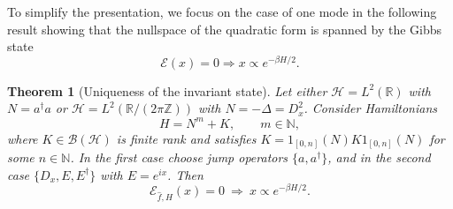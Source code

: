 \documentclass[11pt]{amsart}
\newcommand{\1}{\mathbbm{1}}
\theoremstyle{plain}
\newtheorem{theorem}{Theorem}[section]
\theoremstyle{definition}
\theoremstyle{remark}
\numberwithin{equation}{section}
\begin{document}
To simplify the presentation, we focus on the case of one mode in the following result showing that the nullspace of the quadratic form is spanned by the Gibbs state 
\[ \mathcal E(x)=0 \Rightarrow x \propto e^{-\beta H/2}.\]
\begin{theorem}[Uniqueness of the invariant state]
Let either $\mathcal H=L^2(\mathbb R)$ with $N=a^\dagger a$ or $\mathcal H=L^2(\mathbb R/(2\pi\mathbb Z))$ with $N=-\Delta=D_x^2$. Consider Hamiltonians
\[
H=N^m+K,\qquad m\in\mathbb N,
\]
where $K\in\mathcal B(\mathcal H)$ is finite rank and satisfies $K=1_{[0,n]}(N)K1_{[0,n]}(N)$ for some $n\in\mathbb N$. In the first case choose jump operators $\{a,a^\dagger\}$, and in the second case $\{D_x,E,E^\dagger\}$ with $E=e^{ix}$. Then
\[
\mathcal E_{\hat f,H}(x)=0 \ \Longrightarrow\ x\propto e^{-\beta H/2}.
\]
\end{theorem}
\end{document}
